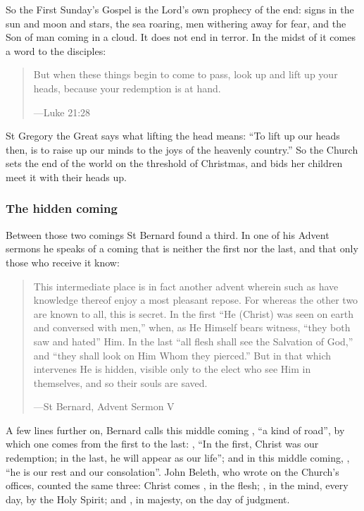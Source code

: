 So the First Sunday's Gospel is the Lord's own prophecy of the end: signs in
the sun and moon and stars, the sea roaring, men withering away for fear, and
the Son of man coming in a cloud. It does not end in terror. In the midst of it
comes a word to the disciples:

\begin{quote}
But when these things begin to come to pass, look up and lift up your heads,
because your redemption is at hand.\par
{\smallskip\noindent\small ---Luke 21:28\par}
\end{quote}

St Gregory the Great says what lifting the head means: ``To lift up our heads
then, is to raise up our minds to the joys of the heavenly country.'' So the
Church sets the end of the world on the threshold of Christmas, and bids her
children meet it with their heads up.

\subsubsection*{The hidden coming}

Between those two comings St Bernard found a third. In one of his Advent sermons
he speaks of a coming that is neither the first nor the last, and that only
those who receive it know:

\begin{quote}
This intermediate place is in fact another advent wherein such as have
knowledge thereof enjoy a most pleasant repose. For whereas the other two are
known to all, this is secret. In the first ``He (Christ) was seen on earth and
conversed with men,'' when, as He Himself bears witness, ``they both saw and
hated'' Him. In the last ``all flesh shall see the Salvation of God,'' and ``they
shall look on Him Whom they pierced.'' But in that which intervenes He is hidden,
visible only to the elect who see Him in themselves, and so their souls are
saved.\par
{\smallskip\noindent\small ---St Bernard, Advent Sermon V\par}
\end{quote}

A few lines further on, Bernard calls this middle coming ,
``a kind of road'', by which one comes from the first to the last: , ``In the
first, Christ was our redemption; in the last, he will appear as our life''; and
in this middle coming, , ``he is our
rest and our consolation''. John Beleth, who wrote on the Church's offices,
counted the same three: Christ comes , in the flesh;
, in the mind, every day, by the Holy Spirit; and , in majesty, on the day of judgment.

